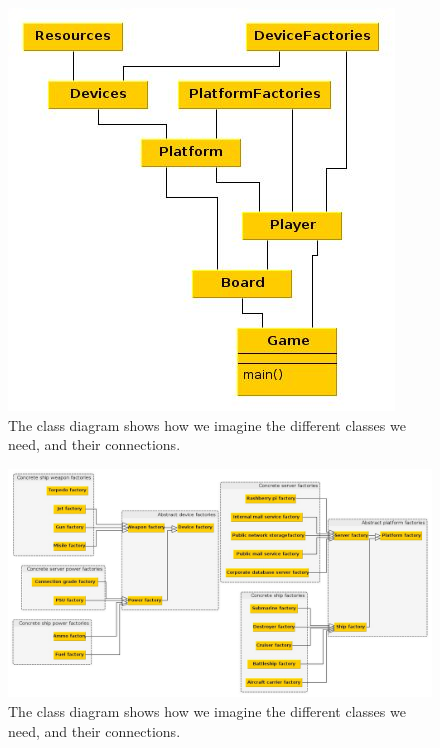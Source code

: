 \documentclass[12pt, a4paper]{article}
\begin{document}
\begin{figure}[H]
    \centering
    \includegraphics[width=\textwidth]{over}
    \caption{The class diagram shows how we imagine the different classes we need, and their connections.
}
    \label{fig:over}
\end{figure}
    
\begin{figure}[H]
    \centering
    \includegraphics[width=\textwidth]{klasse}
    \caption{The class diagram shows how we imagine the different classes we need, and their connections.
}
    \label{fig:klasse}
\end{figure}
\end{document}

